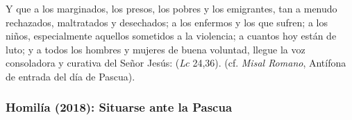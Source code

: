 \begin{body}
Y que a los marginados, los presos, los pobres y los emigrantes, tan a menudo rechazados, maltratados y desechados; a los enfermos y los que sufren; a los niños, especialmente aquellos sometidos a la violencia; a cuantos hoy están de luto; y a todos los hombres y mujeres de buena voluntad, llegue la voz consoladora y curativa del Señor Jesús:  (\textit{Lc} 24,36).  (cf. \textit{Misal Romano}, Antífona de entrada del día de Pascua).
\end{body}

\subsubsection{Homilía (2018): Situarse ante la Pascua}


